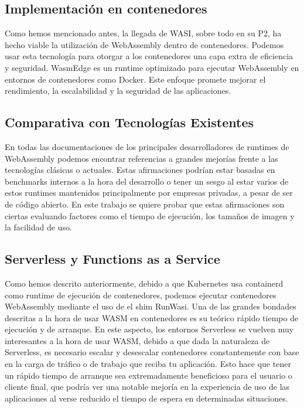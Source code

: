 \subsection{Implementación en contenedores}

Como hemos mencionado antes, la llegada de WASI, sobre todo en su P2, ha hecho viable la utilización de WebAssembly dentro de contenedores. Podemos usar esta tecnología para otorgar a los contenedores una capa extra de eficiencia y seguridad. WasmEdge es un runtime optimizado para ejecutar WebAssembly en entornos de contenedores como Docker. Este enfoque promete mejorar el rendimiento, la escalabilidad y la seguridad de las aplicaciones.

\subsection{Comparativa con Tecnologías Existentes}

En todas las documentaciones de los principales desarrolladores de runtimes de WebAssembly podemos encontrar referencias a grandes mejorías frente a las tecnologías clásicas o actuales. Estas afirmaciones podrían estar basadas en benchmarks internos a la hora del desarrollo o tener un sesgo al estar varios de estos runtimes mantenidos principalmente por empresas privadas, a pesar de ser de código abierto. En este trabajo se quiere probar que estas afirmaciones son ciertas evaluando factores como el tiempo de ejecución, los tamaños de imagen y la facilidad de uso.

\subsection{Serverless y Functions as a Service}

Como hemos descrito anteriormente, debido a que Kubernetes usa containerd como runtime de ejecución de contenedores, podemos ejecutar contenedores WebAssembly mediante el uso de el shim RunWasi. Una de las grandes bondades descritas a la hora de usar WASM en contenedores es su teórico rápido tiempo de ejecución y de arranque. En este aspecto, los entornos Serverless se vuelven muy interesantes a la hora de usar WASM, debido a que dada la naturaleza de Serverless, es necesario escalar y desescalar contenedores constantemente con base en la carga de tráfico o de trabajo que reciba tu aplicación. Esto hace que tener un rápido tiempo de arranque sea extremadamente beneficioso para el usuario o cliente final, que podría ver una notable mejoría en la experiencia de uso de las aplicaciones al verse reducido el tiempo de espera en determinadas situaciones.
